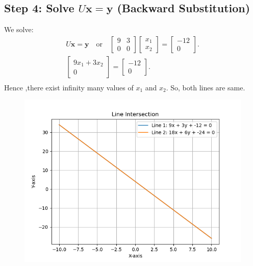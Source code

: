 \documentclass[journal]{IEEEtran}
\numberwithin{equation}{enumi}
\numberwithin{figure}{enumi}
\begin{document}
\begin{enumerate}
	\subsection*{Step 4: Solve $U\mathbf{x} = \mathbf{y}$ (Backward Substitution)}
	We solve:
	\begin{align}
		U\mathbf{x} = \mathbf{y} \quad \text{or} \quad \begin{bmatrix} 9 & 3 \\ 0 & 0 \end{bmatrix} \begin{bmatrix} x_1 \\ x_2 \end{bmatrix} = \begin{bmatrix} -12 \\ 0 \end{bmatrix}.\\
	 \begin{bmatrix} 9x_1 + 3x_2 \\ 0 \end{bmatrix} = \begin{bmatrix} -12 \\ 0 \end{bmatrix}.\\
	\end{align}
	Hence ,there exist infinity many values of $x_1$ and $x_2$.
	So, both lines are same.
\end{enumerate}
\begin{figure}[h!]
   \centering
   \includegraphics[width=0.7\linewidth]{figs/Figure_1.png}
\end{figure}
\end{document}
